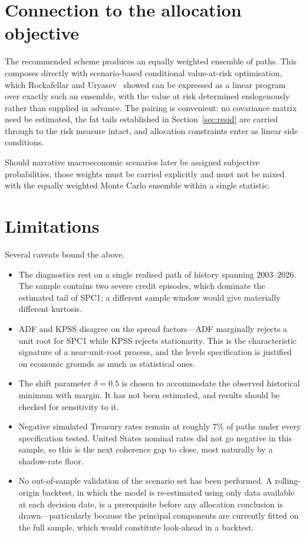 \documentclass[11pt,a4paper]{article}
\begin{document}
\section{Connection to the allocation objective}

The recommended scheme produces an equally weighted ensemble of paths. This
composes directly with scenario-based conditional value-at-risk optimisation,
which Rockafellar and Uryasev~\cite{rockafellar} showed can be expressed as a
linear program over exactly such an ensemble, with the value at risk determined
endogenously rather than supplied in advance. The pairing is convenient: no
covariance matrix need be estimated, the fat tails established in
Section~\ref{sec:resid} are carried through to the risk measure intact, and
allocation constraints enter as linear side conditions.

Should narrative macroeconomic scenarios later be assigned subjective
probabilities, those weights must be carried explicitly and must not be mixed
with the equally weighted Monte Carlo ensemble within a single statistic.

\section{Limitations}

Several caveats bound the above.

\begin{itemize}
  \item The diagnostics rest on a single realised path of history spanning
    $2003$--$2026$. The sample contains two severe credit episodes, which
    dominate the estimated tail of SPC1; a different sample window would give
    materially different kurtosis.

  \item ADF and KPSS disagree on the spread factors---ADF marginally rejects a
    unit root for SPC1 while KPSS rejects stationarity. This is the
    characteristic signature of a near-unit-root process, and the levels
    specification is justified on economic grounds as much as statistical ones.

  \item The shift parameter $\delta = 0.5$ is chosen to accommodate the observed
    historical minimum with margin. It has not been estimated, and results
    should be checked for sensitivity to it.

  \item Negative simulated Treasury rates remain at roughly $7\%$ of paths under
    every specification tested. United States nominal rates did not go negative
    in this sample, so this is the next coherence gap to close, most naturally
    by a shadow-rate floor.

  \item No out-of-sample validation of the scenario set has been performed. A
    rolling-origin backtest, in which the model is re-estimated using only data
    available at each decision date, is a prerequisite before any allocation
    conclusion is drawn---particularly because the principal components are
    currently fitted on the full sample, which would constitute look-ahead in a
    backtest.
\end{itemize}
\end{document}
